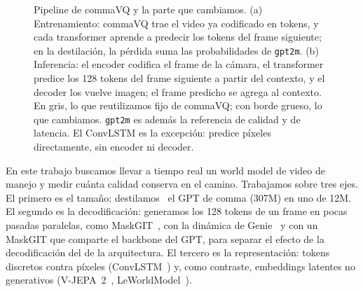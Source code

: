 \documentclass[10pt,twocolumn,a4paper]{article}
\DeclareRobustCommand{\editado}[1]{\textcolor{editado}{#1}}
\DeclareRobustCommand{\editado}[1]{#1}
\begin{document}
\begin{figure}[t]
\vspace{4mm}
\caption{\editado{Pipeline de commaVQ y la parte que cambiamos. (a) Entrenamiento: commaVQ trae el video ya codificado en tokens, y cada transformer aprende a predecir los tokens del frame siguiente; en la destilación, la pérdida suma las probabilidades de \texttt{gpt2m}. (b) Inferencia: el encoder codifica el frame de la cámara, el transformer predice los 128 tokens del frame siguiente a partir del contexto, y el decoder los vuelve imagen; el frame predicho se agrega al contexto. En gris, lo que reutilizamos fijo de commaVQ; con borde grueso, lo que cambiamos. \texttt{gpt2m} es además la referencia de calidad y de latencia. El ConvLSTM es la excepción: predice píxeles directamente, sin encoder ni decoder.}}
\label{fig:pipeline}
\end{figure}

\editado{En este trabajo buscamos llevar a tiempo real un world model de video de manejo y medir cuánta calidad conserva en el camino. Trabajamos sobre tres ejes. El primero es el tamaño: destilamos~\cite{hinton2015distilling} el GPT de comma (307M) en uno de 12M. El segundo es la decodificación: generamos los 128 tokens de un frame en pocas pasadas paralelas, como MaskGIT~\cite{chang2022maskgit}, con la dinámica de Genie~\cite{bruce2024genie} y con un MaskGIT que comparte el backbone del GPT, para separar el efecto de la decodificación del de la arquitectura. El tercero es la representación: tokens discretos contra píxeles (ConvLSTM~\cite{shi2015convlstm}) y, como contraste, embeddings latentes no generativos (V-JEPA~2~\cite{assran2025vjepa2}, LeWorldModel~\cite{maes2026lewm}).}
\end{document}
